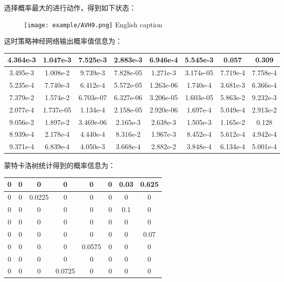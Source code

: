 选择概率最大的进行动作，得到如下状态：

\begin{figure}[!htp]
	\centering
	\texttt{[image: example/AVH9.png]}
	\hspace{0.5cm}
	{English caption}
	\label{fig:human5}
\end{figure}

这时策略神经网络输出概率值信息为：

\begin{tabular}{|c|c|c|c|c|c|c|c|}
	\hline 
	4.364e-3 & 1.047e-3 & 7.525e-3 & 2.883e-3 & 6.946e-4 & 5.545e-3 & 0.057 & 0.309 \\ 
	\hline 
	3.495e-3 & 1.008e-2 & 9.739e-3 & 7.828e-05 & 1.271e-3 & 3.174e-05 & 7.719e-4 & 7.758e-4 \\ 
	\hline 
	5.235e-4 & 7.740e-3 & 6.412e-4 & 5.572e-05 & 1.263e-06 & 1.740e-4 & 3.681e-3 & 6.366e-4 \\ 
	\hline 
	7.379e-2 & 1.574e-2 & 6.703e-07 & 6.327e-06 & 3.206e-05 & 1.603e-05 & 5.863e-2 & 9.232e-3 \\ 
	\hline 
	2.077e-4 & 1.737e-05 & 1.134e-4 & 2.158e-05 & 2.920e-06 & 1.697e-4 & 5.049e-4 & 2.913e-2 \\ 
	\hline 
	9.056e-2 & 1.897e-2 & 3.469e-06 & 2.165e-3 & 2.638e-3 & 1.505e-3 & 1.165e-2 & 0.128 \\ 
	\hline 
	8.939e-4 & 2.178e-4 & 4.440e-4 & 8.316e-2 & 1.967e-3 & 8.452e-4 & 5.612e-4 & 4.942e-4 \\ 
	\hline 
	9.371e-4 & 6.839e-4 & 4.050e-3 & 3.668e-4 & 2.882e-2 & 3.848e-4 & 6.134e-4 &5.001e-4 \\ 
	\hline 
\end{tabular} 

蒙特卡洛树统计得到的概率信息为：

\begin{tabular}{|c|c|c|c|c|c|c|c|}
	\hline 
	0& 0 & 0 &0  & 0 &0  & 0.03 &0.625  \\ 
	\hline 
	0 & 0 & 0.0225 & 0 & 0 & 0 & 0 & 0 \\ 
	\hline 
	0 & 0 & 0 & 0 & 0 & 0 & 0.1 & 0 \\ 
	\hline 
	0 & 0 & 0 & 0 &0 & 0 & 0 & 0 \\ 
	\hline 
	0 & 0 &0& 0 & 0 & 0 & 0 & 0.07\\ 
	\hline 
	0 & 0 & 0 & 0 & 0.0575 & 0 & 0 & 0 \\ 
	\hline 
	0 & 0 & 0 & 0 & 0 & 0 & 0 & 0 \\ 
	\hline 
	0 & 0 & 0 & 0.0725 & 0 & 0 & 0 & 0 \\ 
	\hline 
\end{tabular}

